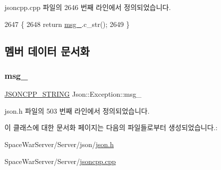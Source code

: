 jsoncpp.\+cpp 파일의 2646 번째 라인에서 정의되었습니다.


\begin{DoxyCode}
2647 \{
2648   \textcolor{keywordflow}{return} \hyperlink{class_json_1_1_exception_aae3cbb8b45bf21480f64502a8329659f}{msg\_}.c\_str();
2649 \}
\end{DoxyCode}


\subsection{멤버 데이터 문서화}
\mbox{\label{class_json_1_1_exception_aae3cbb8b45bf21480f64502a8329659f}} 
\subsubsection{\texorpdfstring{msg\+\_\+}{msg\_}}
{\footnotesize\ttfamily \hyperlink{json_8h_a1e723f95759de062585bc4a8fd3fa4be}{J\+S\+O\+N\+C\+P\+P\+\_\+\+S\+T\+R\+I\+NG} Json\+::\+Exception\+::msg\+\_\+\hspace{0.3cm}{\ttfamily [protected]}}



json.\+h 파일의 503 번째 라인에서 정의되었습니다.



이 클래스에 대한 문서화 페이지는 다음의 파일들로부터 생성되었습니다.\+:\begin{DoxyCompactItemize}
\item 
Space\+War\+Server/\+Server/json/\hyperlink{json_8h}{json.\+h}\item 
Space\+War\+Server/\+Server/\hyperlink{jsoncpp_8cpp}{jsoncpp.\+cpp}\end{DoxyCompactItemize}
